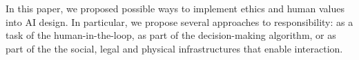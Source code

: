 \documentclass[twocolumn]{article}
\begin{document}
In this paper, we proposed possible ways to implement ethics and human values into AI design. In particular, we propose several approaches to responsibility: as a task of the human-in-the-loop, as part of the decision-making algorithm, or as part of the the social, legal and physical infrastructures that enable interaction. 



\clearpage \newpage



\end{document}
